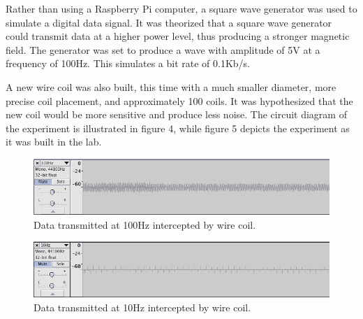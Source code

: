 \documentclass{article}
\begin{document}
Rather than using a Raspberry Pi computer, a square wave generator was used to simulate a digital data signal. It was theorized that a square wave generator could transmit data at a higher power level, thus producing a stronger magnetic field. The generator was set to produce a wave with amplitude of 5V at a frequency of 100Hz. This simulates a bit rate of 0.1Kb/s.

A new wire coil was also built, this time with a much smaller diameter, more precise coil placement, and approximately 100 coils. It was hypothesized that the new coil would be more sensitive and produce less noise. The circuit diagram of the experiment is illustrated in figure 4, while figure 5 depicts the experiment as it was built in the lab.

\begin{figure}
	\includegraphics[width=\linewidth]{images/100hz.png}
	\caption{Data transmitted at 100Hz intercepted by wire coil.}
	\label{fig:100hz}
\end{figure}

\begin{figure}
	\includegraphics[width=\linewidth]{images/10hz.png}
	\caption{Data transmitted at 10Hz intercepted by wire coil.}
	\label{fig:10hz}
\end{figure}

\newpage{}

\end{document}
